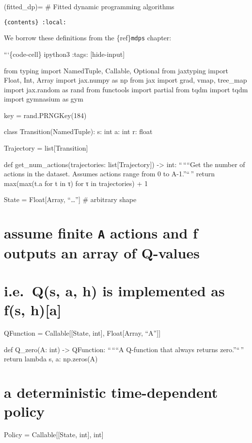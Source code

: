 (fitted\_dp)= \# Fitted dynamic programming algorithms

\texttt{\{contents\}\ :local:}

We borrow these definitions from the \{ref\}\texttt{mdps} chapter:

```\{code-cell\} ipython3 :tags: {[}hide-input{]}

from typing import NamedTuple, Callable, Optional from jaxtyping import
Float, Int, Array import jax.numpy as np from jax import grad, vmap,
tree\_map import jax.random as rand from functools import partial from
tqdm import tqdm import gymnasium as gym

key = rand.PRNGKey(184)

class Transition(NamedTuple): s: int a: int r: float

Trajectory = list{[}Transition{]}

def get\_num\_actions(trajectories: list{[}Trajectory{]})
-\textgreater{} int: ``\,````Get the number of actions in the dataset.
Assumes actions range from 0 to A-1.''``\,'' return max(max(t.a for t in
τ) for τ in trajectories) + 1

State = Float{[}Array, ``\ldots{}''{]} \# arbitrary shape

\section{\texorpdfstring{assume finite \texttt{A} actions and f outputs
an array of
Q-values}{assume finite A actions and f outputs an array of Q-values}}\label{assume-finite-a-actions-and-f-outputs-an-array-of-q-values}

\section{i.e.~Q(s, a, h) is implemented as f(s,
h){[}a{]}}\label{i.e.-qs-a-h-is-implemented-as-fs-ha}

QFunction = Callable{[}{[}State, int{]}, Float{[}Array, ``A''{]}{]}

def Q\_zero(A: int) -\textgreater{} QFunction: ``\,````A Q-function that
always returns zero.''``\,'' return lambda s, a: np.zeros(A)

\section{a deterministic time-dependent
policy}\label{a-deterministic-time-dependent-policy}

Policy = Callable{[}{[}State, int{]}, int{]}

